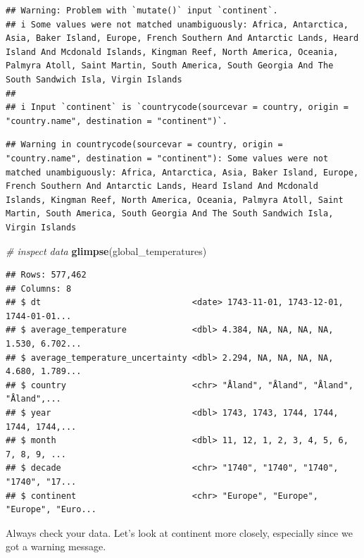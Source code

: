 \documentclass[
]{book}
\newenvironment{Shaded}{\begin{snugshade}}{\end{snugshade}}
\newcommand{\CommentTok}[1]{\textcolor[rgb]{0.56,0.35,0.01}{\textit{#1}}}
\newcommand{\KeywordTok}[1]{\textcolor[rgb]{0.13,0.29,0.53}{\textbf{#1}}}
\newcommand{\NormalTok}[1]{#1}
\newcommand{\OperatorTok}[1]{\textcolor[rgb]{0.81,0.36,0.00}{\textbf{#1}}}
\newcommand{\StringTok}[1]{\textcolor[rgb]{0.31,0.60,0.02}{#1}}
\begin{document}
\begin{verbatim}
## Warning: Problem with `mutate()` input `continent`.
## i Some values were not matched unambiguously: Africa, Antarctica, Asia, Baker Island, Europe, French Southern And Antarctic Lands, Heard Island And Mcdonald Islands, Kingman Reef, North America, Oceania, Palmyra Atoll, Saint Martin, South America, South Georgia And The South Sandwich Isla, Virgin Islands
## 
## i Input `continent` is `countrycode(sourcevar = country, origin = "country.name", destination = "continent")`.
\end{verbatim}

\begin{verbatim}
## Warning in countrycode(sourcevar = country, origin = "country.name", destination = "continent"): Some values were not matched unambiguously: Africa, Antarctica, Asia, Baker Island, Europe, French Southern And Antarctic Lands, Heard Island And Mcdonald Islands, Kingman Reef, North America, Oceania, Palmyra Atoll, Saint Martin, South America, South Georgia And The South Sandwich Isla, Virgin Islands
\end{verbatim}

\begin{Shaded}
\begin{Highlighting}[]
\CommentTok{# inspect data}
\KeywordTok{glimpse}\NormalTok{(global_temperatures)}
\end{Highlighting}
\end{Shaded}

\begin{verbatim}
## Rows: 577,462
## Columns: 8
## $ dt                              <date> 1743-11-01, 1743-12-01, 1744-01-01...
## $ average_temperature             <dbl> 4.384, NA, NA, NA, NA, 1.530, 6.702...
## $ average_temperature_uncertainty <dbl> 2.294, NA, NA, NA, NA, 4.680, 1.789...
## $ country                         <chr> "Åland", "Åland", "Åland", "Åland",...
## $ year                            <dbl> 1743, 1743, 1744, 1744, 1744, 1744,...
## $ month                           <dbl> 11, 12, 1, 2, 3, 4, 5, 6, 7, 8, 9, ...
## $ decade                          <chr> "1740", "1740", "1740", "1740", "17...
## $ continent                       <chr> "Europe", "Europe", "Europe", "Euro...
\end{verbatim}

Always check your data. Let's look at continent more closely, especially since we got a warning message.

\begin{Shaded}
\end{Shaded}
\end{document}
